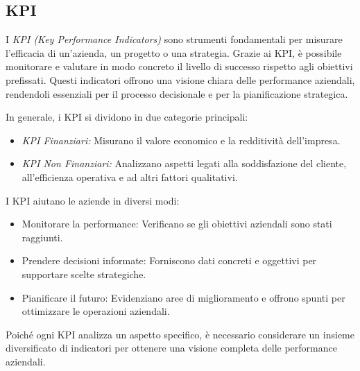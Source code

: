 \subsection{KPI}
I \textit{KPI (Key Performance Indicators)} sono strumenti fondamentali per misurare l'efficacia di un'azienda, un progetto o una strategia. Grazie ai KPI, è possibile monitorare e valutare in modo concreto il livello di successo rispetto agli obiettivi prefissati. Questi indicatori offrono una visione chiara delle performance aziendali, rendendoli essenziali per il processo decisionale e per la pianificazione strategica.

In generale, i KPI si dividono in due categorie principali:
\begin{itemize}
    \item \textit{KPI Finanziari:} Misurano il valore economico e la redditività dell’impresa.
    \item \textit{KPI Non Finanziari:} Analizzano aspetti legati alla soddisfazione del cliente, all’efficienza operativa e ad altri fattori qualitativi.
\end{itemize}
I KPI aiutano le aziende in diversi modi:
\begin{itemize}
    \item Monitorare la performance: Verificano se gli obiettivi aziendali sono stati raggiunti.
    \item Prendere decisioni informate: Forniscono dati concreti e oggettivi per supportare scelte strategiche.
    \item Pianificare il futuro: Evidenziano aree di miglioramento e offrono spunti per ottimizzare le operazioni aziendali.
\end{itemize}
Poiché ogni KPI analizza un aspetto specifico, è necessario considerare un insieme diversificato di indicatori per ottenere una visione completa delle performance aziendali.

